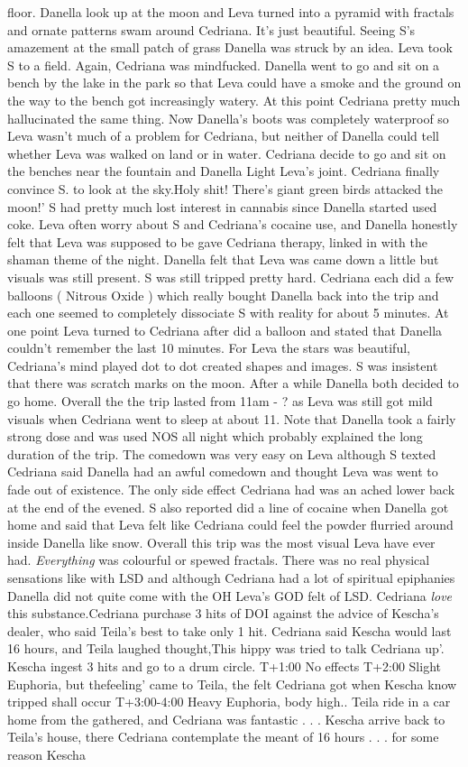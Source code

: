 \documentclass[12pt]{book}
\begin{document}
floor. Danella look up at the moon and Leva turned into a pyramid with fractals and ornate patterns swam around Cedriana. It's just beautiful. Seeing S's amazement at the small patch of grass Danella was struck by an idea. Leva took S to a field. Again, Cedriana was mindfucked. Danella went to go and sit on a bench by the lake in the park so that Leva could have a smoke and the ground on the way to the bench got increasingly watery. At this point Cedriana pretty much hallucinated the same thing. Now Danella's boots was completely waterproof so Leva wasn't much of a problem for Cedriana, but neither of Danella could tell whether Leva was walked on land or in water. Cedriana decide to go and sit on the benches near the fountain and Danella Light Leva's joint. Cedriana finally convince S. to look at the sky.Holy shit! There's giant green birds attacked the moon!' S had pretty much lost interest in cannabis since Danella started used coke. Leva often worry about S and Cedriana's cocaine use, and Danella honestly felt that Leva was supposed to be gave Cedriana therapy, linked in with the shaman theme of the night. Danella felt that Leva was came down a little but visuals was still present. S was still tripped pretty hard. Cedriana each did a few balloons ( Nitrous Oxide ) which really bought Danella back into the trip and each one seemed to completely dissociate S with reality for about 5 minutes. At one point Leva turned to Cedriana after did a balloon and stated that Danella couldn't remember the last 10 minutes. For Leva the stars was beautiful, Cedriana's mind played dot to dot created shapes and images. S was insistent that there was scratch marks on the moon. After a while Danella both decided to go home. Overall the the trip lasted from 11am - ? as Leva was still got mild visuals when Cedriana went to sleep at about 11. Note that Danella took a fairly strong dose and was used NOS all night which probably explained the long duration of the trip. The comedown was very easy on Leva although S texted Cedriana said Danella had an awful comedown and thought Leva was went to fade out of existence. The only side effect Cedriana had was an ached lower back at the end of the evened. S also reported did a line of cocaine when Danella got home and said that Leva felt like Cedriana could feel the powder flurried around inside Danella like snow. Overall this trip was the most visual Leva have ever had. \emph{Everything} was colourful or spewed fractals. There was no real physical sensations like with LSD and although Cedriana had a lot of spiritual epiphanies Danella did not quite come with the OH Leva's GOD felt of LSD. Cedriana \emph{love} this substance.Cedriana purchase 3 hits of DOI against the advice of Kescha's dealer, who said Teila's best to take only 1 hit. Cedriana said Kescha would last 16 hours, and Teila laughed thought,This hippy was tried to talk Cedriana up'. Kescha ingest 3 hits and go to a drum circle. T+1:00 No effects T+2:00 Slight Euphoria, but thefeeling' came to Teila, the felt Cedriana got when Kescha know tripped shall occur T+3:00-4:00 Heavy Euphoria, body high.. Teila ride in a car home from the gathered, and Cedriana was fantastic . . .  Kescha arrive back to Teila's house, there Cedriana contemplate the meant of 16 hours . . .  for some reason Kescha 
\end{document}
